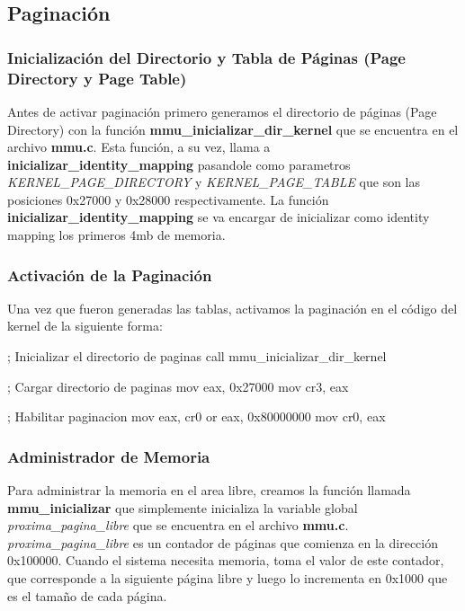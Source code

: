 \subsection{Paginación}

\subsubsection{Inicialización del Directorio y Tabla de Páginas (Page Directory y Page Table)}

Antes de activar paginación primero generamos el directorio de páginas (Page Directory) con la función \textbf{mmu_inicializar_dir_kernel} que se encuentra en el archivo \textbf{mmu.c}. Esta función, a su vez, llama a  \textbf{inicializar_identity_mapping} pasandole como parametros \textit{KERNEL_PAGE_DIRECTORY} y \textit{KERNEL_PAGE_TABLE} que son las posiciones 0x27000 y 0x28000 respectivamente.
La función \textbf{inicializar_identity_mapping} se va encargar de inicializar como identity mapping los primeros 4mb de memoria.

\subsubsection{Activación de la Paginación}

Una vez que fueron generadas las tablas, activamos la paginación en el código del kernel de la siguiente forma:

\begin{algorithm}[H]
		\begin{algorithmic}[H!]
			\State ; Inicializar el directorio de paginas
    		\State call mmu_inicializar_dir_kernel

			\State; Cargar directorio de paginas
    		\State mov eax, 0x27000
    		\State mov cr3, eax

    		\State ; Habilitar paginacion
    		\State mov eax, cr0
    		\State or eax, 0x80000000
    		\State mov cr0, eax

		\end{algorithmic}
\end{algorithm}


\subsubsection{Administrador de Memoria}

Para administrar la memoria en el area libre, creamos la función llamada \textbf{mmu_inicializar} que simplemente inicializa la variable global \textit{proxima_pagina_libre} que se encuentra en el archivo \textbf{mmu.c}.
\textit{proxima_pagina_libre} es un contador de páginas que comienza en la dirección 0x100000. 
Cuando el sistema necesita memoria, toma el valor de este contador, que corresponde a la siguiente página libre y luego lo incrementa en 0x1000 que es el tamaño de cada página.


